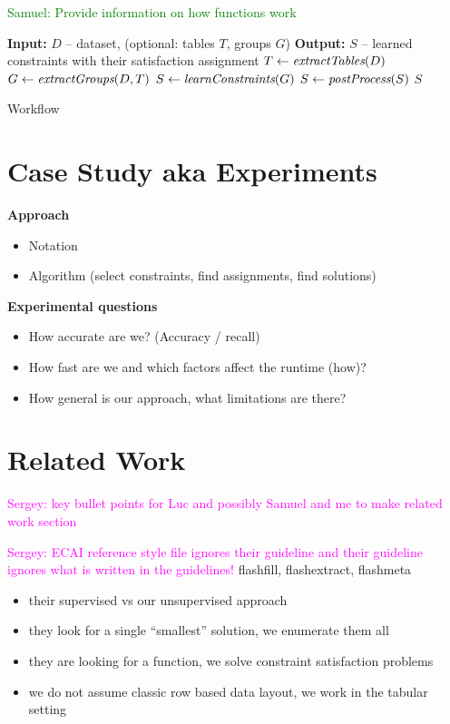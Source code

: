 \documentclass{ecai}
\newcommand{\sergey}[1]{\textcolor{magenta}{{\sc Sergey:} #1}\xspace}
\newcommand{\samuel}[1]{\textcolor{green}{{\sc Samuel:} #1}\xspace}
\begin{document}
\samuel{Provide information on how functions work}

\begin{algorithm}[thb]
  \begin{algorithmic}
    \footnotesize
    \State \textbf{Input:} $D$ -- dataset, (optional: tables $T$, groups $G$)
    \State \textbf{Output:} $S$ -- learned constraints with their satisfaction assignment
      \State $T \gets \textit{extractTables}(D)$
    \EndIf
      \State $G \gets \textit{extractGroups}(D, T)$
    \EndIf
    \State $S \gets \textit{learnConstraints}(G)$
    \State $S \gets \textit{postProcess}(S)$
    \State \Return $S$
\end{algorithmic}
\caption{Workflow}
\label{algo:workflow}
\end{algorithm}

\section{Case Study aka Experiments}

\textbf{Approach}
\begin{itemize}
  \item Notation
  \item Algorithm (select constraints, find assignments, find solutions)
\end{itemize}

{\bfseries 
  Experimental questions
}
\begin{itemize}
  \item  How accurate are we? (Accuracy / recall)
  \item  How fast are we and which factors affect the runtime (how)?
  \item  How general is our approach, what limitations are there?
\end{itemize}


\section{Related Work}
\sergey{key bullet points for Luc and possibly Samuel and me to make related work section}

\sergey{ECAI reference style file ignores their guideline and their guideline ignores what is written in the guidelines!}
flashfill, flashextract, flashmeta \cite{flashfill,flashextract,flashmeta}
\begin{itemize}
  \item their supervised vs our unsupervised approach
  \item they look for a single ``smallest'' solution, we enumerate them all
  \item they are looking for a function, we solve constraint satisfaction problems
  \item we do not assume classic row based data layout, we work in the tabular setting
\end{itemize}
\end{document}
